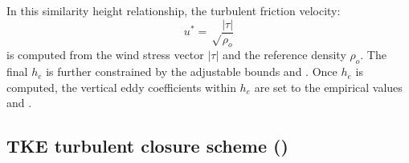 \documentclass[../tex_main/NEMO_manual]{subfiles}
\begin{document}
In this similarity height relationship, the turbulent friction velocity:
\begin{equation}
u^{*} = \sqrt \frac {|\tau|} {\rho_o}
\end{equation}
is computed from the wind stress vector $|\tau|$ and the reference density $ \rho_o$.
The final $h_{e}$ is further constrained by the adjustable bounds  and .
Once $h_{e}$ is computed, the vertical eddy coefficients within $h_{e}$ are set to
the empirical values  and  \citep{Lermusiaux2001}.

\subsection{TKE turbulent closure scheme (\protect{})}
\label{subsec:ZDF_tke}


\end{document}
